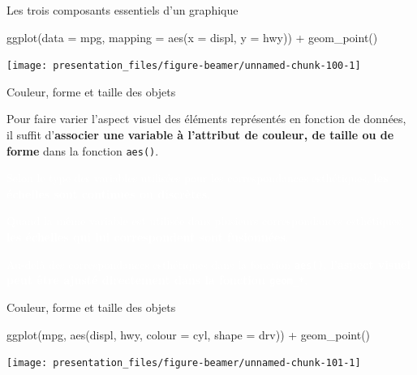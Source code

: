 \documentclass[12pt,handout,ignorenonframetext,]{beamer}
\newenvironment{Shaded}{}{}
\newcommand{\KeywordTok}[1]{\textcolor[rgb]{0.00,0.00,1.00}{{#1}}}
\newcommand{\DataTypeTok}[1]{{#1}}
\newcommand{\StringTok}[1]{\textcolor[rgb]{0.00,0.50,0.50}{{#1}}}
\newcommand{\NormalTok}[1]{{#1}}
\renewenvironment{Shaded}{\begin{snugshade}}{\end{snugshade}}
\begin{document}
\begin{frame}[fragile]{\large Les trois composants essentiels d'un
graphique}

\center \small 

\begin{Shaded}
\begin{Highlighting}[]
\KeywordTok{ggplot}\NormalTok{(}\DataTypeTok{data =} \NormalTok{mpg, }\DataTypeTok{mapping =} \KeywordTok{aes}\NormalTok{(}\DataTypeTok{x =} \NormalTok{displ, }\DataTypeTok{y =} \NormalTok{hwy)) +}
\StringTok{  }\KeywordTok{geom_point}\NormalTok{()}
\end{Highlighting}
\end{Shaded}

\texttt{[image: presentation\_files/figure-beamer/unnamed-chunk-100-1]}

\end{frame}

\begin{frame}{Couleur, forme et taille des objets}

Pour faire varier l'aspect visuel des éléments représentés en fonction
de données, il suffit
d'\textbf{associer une variable à l'attribut de couleur, de taille ou de forme}
dans la fonction \texttt{aes()}.

\textcolor{white}{Selon le type des variables utilisées pour les correspondances esthétiques, \textbf{les échelles sont continues ou discrètes}.}

\textcolor{white}{Quand la même variable est utilisée dans plusieurs correspondances esthétiques, \textbf{les échelles qui lui correspondent sont fusionnées}.}

\textcolor{white}{Au-delà des correspondances esthétiques dans la fonction \texttt{aes()}, \textbf{l'aspect visuel peut être ajusté directement dans la fonction \texttt{geom\_*}}.}

\end{frame}

\begin{frame}[fragile]{Couleur, forme et taille des objets}

\footnotesize \center

\begin{Shaded}
\begin{Highlighting}[]
\KeywordTok{ggplot}\NormalTok{(mpg, }\KeywordTok{aes}\NormalTok{(displ, hwy, }\DataTypeTok{colour =} \NormalTok{cyl, }\DataTypeTok{shape =} \NormalTok{drv)) +}
\StringTok{  }\KeywordTok{geom_point}\NormalTok{()}
\end{Highlighting}
\end{Shaded}

\texttt{[image: presentation\_files/figure-beamer/unnamed-chunk-101-1]}

\end{frame}
\end{document}
